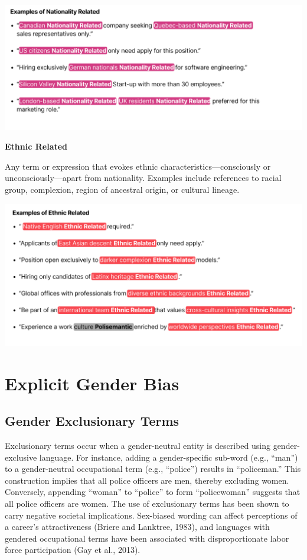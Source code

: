 \documentclass[
]{book}
\begin{document}
\includegraphics{images/Nationality-Related.png}

{\textbf{Ethnic Related}}

Any term or expression that evokes ethnic characteristics---consciously or unconsciously---apart from nationality. Examples include references to racial group, complexion, region of ancestral origin, or cultural lineage.

\includegraphics{images/Ethnic-Related.png}

\section{Explicit Gender Bias}\label{gender-bias}

\subsection*{Gender Exclusionary Terms}\label{gender-exclusionary-terms}

Exclusionary terms occur when a gender-neutral entity is described using gender-exclusive language. For instance, adding a gender-specific sub-word (e.g., ``man'') to a gender-neutral occupational term (e.g., ``police'') results in ``policeman.'' This construction implies that all police officers are men, thereby excluding women. Conversely, appending ``woman'' to ``police'' to form ``policewoman'' suggests that all police officers are women. The use of exclusionary terms has been shown to carry negative societal implications. Sex-biased wording can affect perceptions of a career's attractiveness (Briere and Lanktree, 1983), and languages with gendered occupational terms have been associated with disproportionate labor force participation (Gay et al., 2013).
\end{document}

